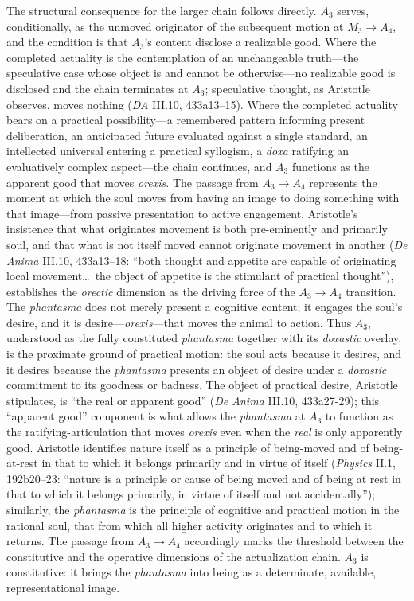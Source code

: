 \documentclass{article}
\begin{document}
The structural consequence for the larger chain follows directly. $A_3$ serves, conditionally, as the unmoved originator of the subsequent motion at $M_3 \rightarrow A_4$, and the condition is that $A_3$'s content disclose a realizable good. Where the completed actuality is the contemplation of an unchangeable truth---the speculative case whose object is and cannot be otherwise---no realizable good is disclosed and the chain terminates at $A_3$; speculative thought, as Aristotle observes, moves nothing (\textit{DA} III.10, 433a13--15). Where the completed actuality bears on a practical possibility---a remembered pattern informing present deliberation, an anticipated future evaluated against a single standard, an intellected universal entering a practical syllogism, a \textit{doxa} ratifying an evaluatively complex aspect---the chain continues, and $A_3$ functions as the apparent good that moves \textit{orexis}. The passage from $A_3 \to A_4$ represents the moment at which the soul moves from having an image to doing something with that image---from passive presentation to active engagement. Aristotle's insistence that what originates movement is both pre-eminently and primarily soul, and that what is not itself moved cannot originate movement in another (\textit{De Anima} III.10, 433a13--18: ``both thought and appetite are capable of originating local movement\ldots\ the object of appetite is the stimulant of practical thought''), establishes the \textit{orectic} dimension as the driving force of the $A_3 \to A_4$ transition. The \textit{phantasma} does not merely present a cognitive content; it engages the soul's desire, and it is desire---\textit{orexis}---that moves the animal to action. Thus $A_3$, understood as the fully constituted \textit{phantasma} together with its \textit{doxastic} overlay, is the proximate ground of practical motion: the soul acts because it desires, and it desires because the \textit{phantasma} presents an object of desire under a \textit{doxastic} commitment to its goodness or badness. The object of practical desire, Aristotle stipulates, is ``the real or apparent good'' (\textit{De Anima} III.10, 433a27-29); this ``apparent good'' component is what allows the \textit{phantasma} at $A_3$ to function as the ratifying-articulation that moves \textit{orexis} even when the \textit{real} is only apparently good. Aristotle identifies nature itself as a principle of being-moved and of being-at-rest in that to which it belongs primarily and in virtue of itself (\textit{Physics} II.1, 192b20--23: ``nature is a principle or cause of being moved and of being at rest in that to which it belongs primarily, in virtue of itself and not accidentally''); similarly, the \textit{phantasma} is the principle of cognitive and practical motion in the rational soul, that from which all higher activity originates and to which it returns. The passage from $A_3 \to A_4$ accordingly marks the threshold between the constitutive and the operative dimensions of the actualization chain. $A_3$ is constitutive: it brings the \textit{phantasma} into being as a determinate, available, representational image. 
\end{document}
